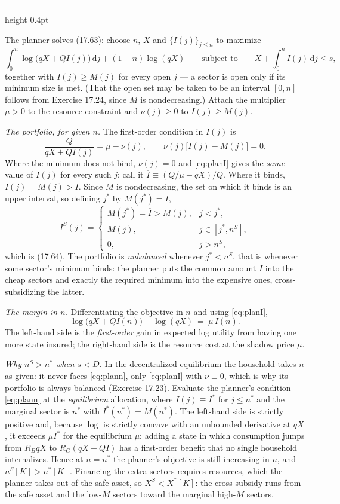 \documentclass[11pt,letterpaper,reqno]{amsart}
\makeatletter
\newcommand{\ol}[1]{\overline{#1}}
\newcommand{\dd}{\,\mathrm{d}}
\newcommand{\as@head}[3]{%
  \par\addvspace{1.6ex}\penalty-200\relax
  \phantomsection
  \addcontentsline{toc}{subsection}{#1 #2\texorpdfstring{\ifx\relax#3\relax\else\quad #3\fi}{}}%
  {\color{RuleGrey}\hrule height 0.4pt}%
  \nobreak\vspace{0.8ex}\nobreak
  \noindent{\bfseries #1 #2}%
  \ifx\relax#3\relax\else\quad{\bfseries\itshape #3}\fi
  \par\nobreak\vspace{0.4ex}\nobreak
  \as@beginstatement
}
\newcommand{\as@beginstatement}{\begingroup\itshape\ignorespaces}
\newenvironment{aex}[2]{\as@head{Exercise}{#1}{#2}}{\par\addvspace{1.2ex}}
\newcommand{\bk}[1]{\textup{\textsc{#1}}}
\renewcommand{\as@beginstatement}{\ignorespaces}
\makeatother
\begin{document}
\begin{aex}{17.29}{}
The planner solves \bk{(17.63)}: choose $n$, $X$ and $\{I(j)\}_{j\le n}$ to maximize
\[
\int_0^{n}\log\bigl(qX+QI(j)\bigr)\dd j+(1-n)\log(qX)
\qquad\text{subject to}\qquad
X+\int_0^{n}I(j)\dd j\le s ,
\]
together with $I(j)\ge M(j)$ for every open $j$ --- a sector is open only if its minimum size is
met.  (That the open set may be taken to be an interval $[0,n]$ follows from Exercise 17.24,
since $M$ is nondecreasing.)  Attach the multiplier $\mu>0$ to the resource constraint and
$\nu(j)\ge0$ to $I(j)\ge M(j)$.

\emph{The portfolio, for given $n$.}  The first-order condition in $I(j)$ is
\begin{equation}
\frac{Q}{qX+QI(j)}=\mu-\nu(j),\qquad \nu(j)\bigl[I(j)-M(j)\bigr]=0 .
\label{eq:planI}
\end{equation}
Where the minimum does not bind, $\nu(j)=0$ and \eqref{eq:planI} gives the \emph{same} value of
$I(j)$ for every such $j$; call it $\ol I\equiv(Q/\mu-qX)/Q$.  Where it binds, $I(j)=M(j)>\ol I$.
Since $M$ is nondecreasing, the set on which it binds is an upper interval, so defining
$j^*$ by $M(j^*)=\ol I$,
\[
\boxed{\
I^S(j)=\begin{cases}
M(j^*)=\ol I>M(j), & j<j^*,\\[2pt]
M(j), & j\in[j^*,n^S],\\[2pt]
0, & j>n^S,
\end{cases}\ }
\]
which is \bk{(17.64)}.  The portfolio is \emph{unbalanced} whenever $j^*<n^S$, that is whenever
some sector's minimum binds: the planner puts the common amount $\ol I$ into the cheap sectors
and exactly the required minimum into the expensive ones, cross-subsidizing the latter.

\emph{The margin in $n$.}  Differentiating the objective in $n$ and using \eqref{eq:planI},
\begin{equation}
\log\bigl(qX+QI(n)\bigr)-\log(qX)\ =\ \mu\,I(n) .
\label{eq:plann}
\end{equation}
The left-hand side is the \emph{first-order} gain in expected log utility from having one more
state insured; the right-hand side is the resource cost at the shadow price $\mu$.

\emph{Why $n^S>n^*$ when $s<D$.}  In the decentralized equilibrium the household takes $n$ as
given: it never faces \eqref{eq:plann}, only \eqref{eq:planI} with $\nu\equiv0$, which is why its
portfolio is always balanced (Exercise 17.23).  Evaluate the planner's condition
\eqref{eq:plann} at the \emph{equilibrium} allocation, where $I(j)\equiv I^*$ for $j\le n^*$ and
the marginal sector is $n^*$ with $I^*(n^*)=M(n^*)$.  The left-hand side is strictly positive
and, because $\log$ is strictly concave with an unbounded derivative at $qX$, it exceeds
$\mu I^*$ for the equilibrium $\mu$: adding a state in which consumption jumps from $R_BqX$ to
$R_G(qX+QI)$ has a first-order benefit that no single household internalizes.  Hence at
$n=n^*$ the planner's objective is still increasing in $n$, and $n^S[K]>n^*[K]$.  Financing the
extra sectors requires resources, which the planner takes out of the safe asset, so
$X^S<X^*[K]$: the cross-subsidy runs from the safe asset and the low-$M$ sectors toward the
marginal high-$M$ sectors.


\end{aex}
\end{document}

